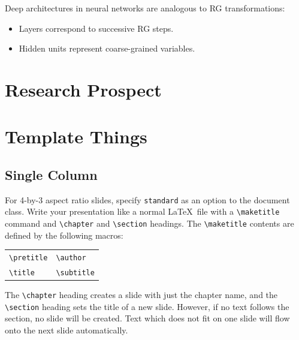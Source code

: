 \documentclass{antclass}
\begin{document}
Deep architectures in neural networks are analogous to RG transformations:
\begin{itemize}
\item Layers correspond to successive RG steps.
\item Hidden units represent coarse-grained variables.
\end{itemize}

\pagebreak

\chapter{Research Prospect}

\chapter{Template Things}
\section{Single Column}

For 4-by-3 aspect ratio slides, specify \verb|standard| as an option to the
document class. Write your presentation like a normal \LaTeX\ file with a
\verb|\maketitle| command and \verb|\chapter| and \verb|\section| headings. The
\verb|\maketitle| contents are defined by the following macros:
\begin{center}
    \begin{tabular}{l@{\qquad}l}
        \verb|\pretitle| &
        \verb|\author| \\
        \verb|\title| &
        \verb|\subtitle|
    \end{tabular}
\end{center}
The \verb|\chapter| heading creates a slide with just the chapter name, and the
\verb|\section| heading sets the title of a new slide. However, if no text
follows the section, no slide will be created. Text which does not fit on one
slide will flow onto the next slide automatically.
\end{document}
